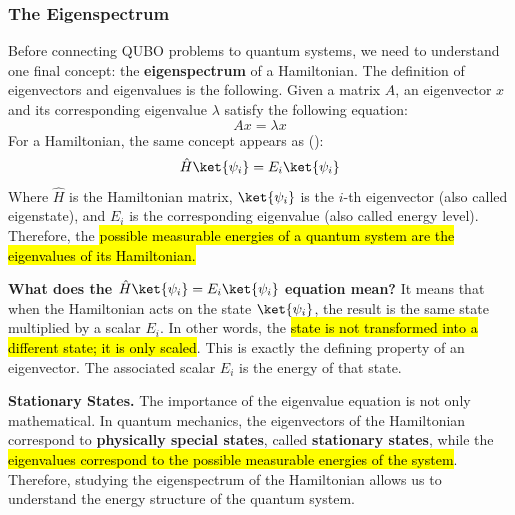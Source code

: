 \subsubsection{The Eigenspectrum}\label{sec:the-eigenspectrum}

Before connecting QUBO problems to quantum systems, we need to understand one final concept: the \textbf{eigenspectrum} of a Hamiltonian. The definition of eigenvectors and eigenvalues is the following. Given a matrix $A$, an eigenvector $x$ and its corresponding eigenvalue $\lambda$ satisfy the following equation:
\begin{equation*}
    Ax = \lambda x
\end{equation*}
For a Hamiltonian, the same concept appears as ():
\begin{equation*}
    \hat{H} \ket{\psi_{i}} = E_{i} \ket{\psi_{i}}
\end{equation*}
Where $\hat{H}$ is the Hamiltonian matrix, $\ket{\psi_{i}}$ is the $i$-th eigenvector (also called eigenstate), and $E_{i}$ is the corresponding eigenvalue (also called energy level). Therefore, the \hl{possible measurable energies of a quantum system are the eigenvalues of its Hamiltonian.}

\highspace
\textcolor{Green3}{ \textbf{What does the $\hat{H} \ket{\psi_{i}} = E_{i} \ket{\psi_{i}}$ equation mean?}} It means that when the Hamiltonian acts on the state $\ket{\psi_{i}}$, the result is the same state multiplied by a scalar $E_{i}$. In other words, the \hl{state is not transformed into a different state; it is only scaled}. This is exactly the defining property of an eigenvector. The associated scalar $E_{i}$ is the energy of that state.

\highspace
\textcolor{Green3}{ \textbf{Stationary States.}} The importance of the eigenvalue equation is not only mathematical. In quantum mechanics, the eigenvectors of the Hamiltonian correspond to \textbf{physically special states}, called \textbf{stationary states}, while the \hl{eigenvalues correspond to the possible measurable energies of the system}. Therefore, studying the eigenspectrum of the Hamiltonian allows us to understand the energy structure of the quantum system.

